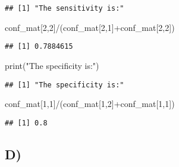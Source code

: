 \documentclass[
]{article}
\newenvironment{Shaded}{\begin{snugshade}}{\end{snugshade}}
\newcommand{\DecValTok}[1]{\textcolor[rgb]{0.00,0.00,0.81}{#1}}
\newcommand{\FunctionTok}[1]{\textcolor[rgb]{0.00,0.00,0.00}{#1}}
\newcommand{\NormalTok}[1]{#1}
\newcommand{\SpecialCharTok}[1]{\textcolor[rgb]{0.00,0.00,0.00}{#1}}
\newcommand{\StringTok}[1]{\textcolor[rgb]{0.31,0.60,0.02}{#1}}
\begin{document}
\begin{verbatim}
## [1] "The sensitivity is:"
\end{verbatim}

\begin{Shaded}
\begin{Highlighting}[]
\NormalTok{conf\_mat[}\DecValTok{2}\NormalTok{,}\DecValTok{2}\NormalTok{]}\SpecialCharTok{/}\NormalTok{(conf\_mat[}\DecValTok{2}\NormalTok{,}\DecValTok{1}\NormalTok{]}\SpecialCharTok{+}\NormalTok{conf\_mat[}\DecValTok{2}\NormalTok{,}\DecValTok{2}\NormalTok{])}
\end{Highlighting}
\end{Shaded}

\begin{verbatim}
## [1] 0.7884615
\end{verbatim}

\begin{Shaded}
\begin{Highlighting}[]
\FunctionTok{print}\NormalTok{(}\StringTok{"The specificity is:"}\NormalTok{)}
\end{Highlighting}
\end{Shaded}

\begin{verbatim}
## [1] "The specificity is:"
\end{verbatim}

\begin{Shaded}
\begin{Highlighting}[]
\NormalTok{conf\_mat[}\DecValTok{1}\NormalTok{,}\DecValTok{1}\NormalTok{]}\SpecialCharTok{/}\NormalTok{(conf\_mat[}\DecValTok{1}\NormalTok{,}\DecValTok{2}\NormalTok{]}\SpecialCharTok{+}\NormalTok{conf\_mat[}\DecValTok{1}\NormalTok{,}\DecValTok{1}\NormalTok{])}
\end{Highlighting}
\end{Shaded}

\begin{verbatim}
## [1] 0.8
\end{verbatim}

\hypertarget{d-2}{%
\subsection{D)}\label{d-2}}
\end{document}
